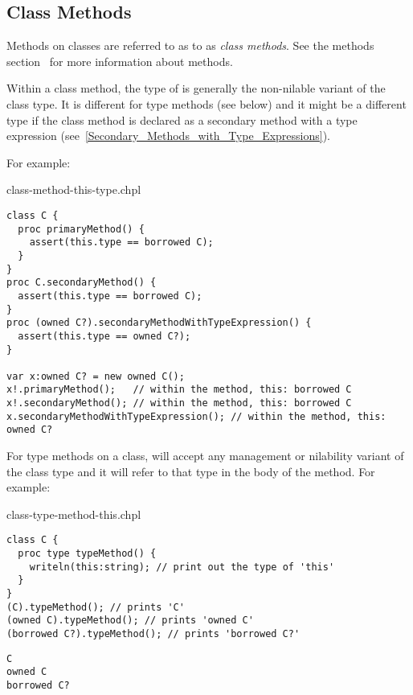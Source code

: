 \subsection{Class Methods}
\label{Class_Methods}

Methods on classes are referred to as to as \emph{class methods}.
See the methods section~ for more information about methods.

Within a class method, the type of  is generally the
non-nilable  variant of the class type. It is different
for type methods (see below) and it might be a different type if the
class method is declared as a secondary method with a type
expression (see~\ref{Secondary_Methods_with_Type_Expressions}).

For example:

\begin{chapelexample}{class-method-this-type.chpl}
\begin{chapel}
\begin{verbatim}
class C {
  proc primaryMethod() {
    assert(this.type == borrowed C);
  }
}
proc C.secondaryMethod() {
  assert(this.type == borrowed C);
}
proc (owned C?).secondaryMethodWithTypeExpression() {
  assert(this.type == owned C?);
}

var x:owned C? = new owned C();
x!.primaryMethod();   // within the method, this: borrowed C
x!.secondaryMethod(); // within the method, this: borrowed C
x.secondaryMethodWithTypeExpression(); // within the method, this: owned C?
\end{verbatim}
\end{chapel}
\end{chapelexample}

For type methods on a class,  will accept any management or
nilability variant of the class type and it will refer to that type in
the body of the method. For example:

\begin{chapelexample}{class-type-method-this.chpl}
\begin{chapel}
\begin{verbatim}
class C {
  proc type typeMethod() {
    writeln(this:string); // print out the type of 'this'
  }
}
(C).typeMethod(); // prints 'C'
(owned C).typeMethod(); // prints 'owned C'
(borrowed C?).typeMethod(); // prints 'borrowed C?'
\end{verbatim}
\end{chapel}
\begin{chapeloutput}
\begin{verbatim}
C
owned C
borrowed C?
\end{verbatim}
\end{chapeloutput}
\end{chapelexample}

